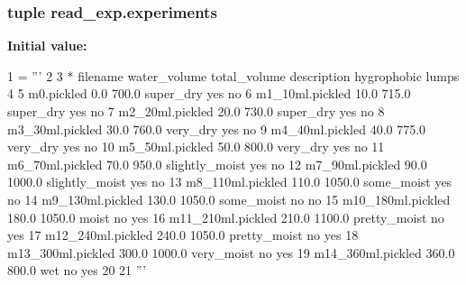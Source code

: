 \subsubsection[{experiments}]{\setlength{\rightskip}{0pt plus 5cm}tuple read\+\_\+exp.\+experiments}\label{namespaceread__exp_a5a925508ad4c6f51071bd32b5537f5c0}
{\bfseries Initial value\+:}
\begin{DoxyCode}
1 = \textcolor{stringliteral}{'''}
2 \textcolor{stringliteral}{}
3 \textcolor{stringliteral}{*   filename            water\_volume    total\_volume    description         hygrophobic     lumps}
4 \textcolor{stringliteral}{}
5 \textcolor{stringliteral}{    m0.pickled          0.0             700.0           super\_dry           yes             no}
6 \textcolor{stringliteral}{    m1\_10ml.pickled     10.0            715.0           super\_dry           yes             no}
7 \textcolor{stringliteral}{    m2\_20ml.pickled     20.0            730.0           super\_dry           yes             no}
8 \textcolor{stringliteral}{    m3\_30ml.pickled     30.0            760.0           very\_dry            yes             no}
9 \textcolor{stringliteral}{    m4\_40ml.pickled     40.0            775.0           very\_dry            yes             no}
10 \textcolor{stringliteral}{    m5\_50ml.pickled     50.0            800.0           very\_dry            yes             no}
11 \textcolor{stringliteral}{    m6\_70ml.pickled     70.0            950.0           slightly\_moist      yes             no}
12 \textcolor{stringliteral}{    m7\_90ml.pickled     90.0            1000.0          slightly\_moist      yes             no}
13 \textcolor{stringliteral}{    m8\_110ml.pickled    110.0           1050.0          some\_moist          yes             no}
14 \textcolor{stringliteral}{    m9\_130ml.pickled    130.0           1050.0          some\_moist          no              no}
15 \textcolor{stringliteral}{    m10\_180ml.pickled   180.0           1050.0          moist               no              yes}
16 \textcolor{stringliteral}{    m11\_210ml.pickled   210.0           1100.0          pretty\_moist        no              yes}
17 \textcolor{stringliteral}{    m12\_240ml.pickled   240.0           1050.0          pretty\_moist        no              yes}
18 \textcolor{stringliteral}{    m13\_300ml.pickled   300.0           1000.0          very\_moist          no              yes}
19 \textcolor{stringliteral}{    m14\_360ml.pickled   360.0           800.0           wet                 no              yes}
20 \textcolor{stringliteral}{}
21 \textcolor{stringliteral}{'''}
\end{DoxyCode}
